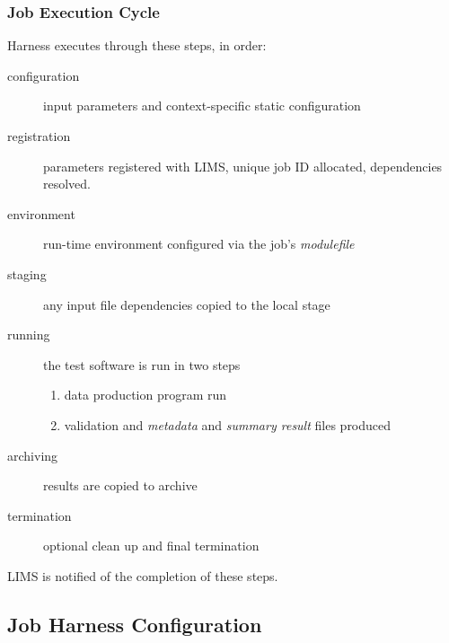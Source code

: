 \documentclass[xcolor=dvipsnames]{beamer}
\begin{document}
\begin{frame}
  \frametitle{Job Execution Cycle}
  Harness executes through these steps, in order:
  \begin{description}
  \item[configuration] input parameters and context-specific static configuration
  \item[registration] parameters registered with LIMS, unique job
    ID allocated, dependencies resolved.
  \item[environment] run-time environment configured via the job's \textit{modulefile}
  \item[staging] any input file dependencies copied to the local stage
  \item[running] the test software is run in two steps
    \begin{enumerate}
    \item data production program run
    \item validation and \textit{metadata} and \textit{summary result}
      files produced
    \end{enumerate}
  \item[archiving] results are copied to archive
  \item[termination] optional clean up and final termination
  \end{description}
  LIMS is notified of the completion of these steps.
\end{frame}

\subsection{Job Harness Configuration}
\end{document}
